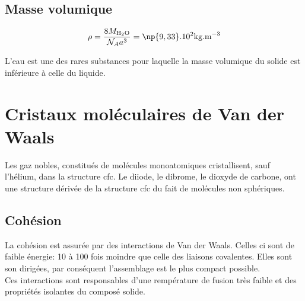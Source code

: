\subsection{Masse volumique}
\begin{equation}
    \rho = \frac{8M_{\text{H}_2\text{O}}}{\mathcal{N}_A
        a^3} = \np{9,33}.10^2\text{kg.m}^{-3}
\end{equation}
\begin{rem}
    L'eau est une des rares substances pour laquelle la
    masse volumique du solide est inférieure à celle du
    liquide.
\end{rem}

\section{Cristaux moléculaires de Van der Waals}
Les gaz nobles, constitués de molécules monoatomiques
cristallisent, sauf l’hélium, dans la structure cfc.
Le diiode, le dibrome, le dioxyde de carbone, ont
une structure dérivée de la structure cfc du
fait de molécules non sphériques.
\subsection{Cohésion}
La cohésion est assurée par des interactions de
Van der Waals. Celles ci sont de faible énergie:
10 à 100 fois moindre que celle des liaisons covalentes.
Elles sont son dirigées, par conséquent l'assemblage
est le plus compact possible.\\
Ces interactions sont responsables d'une rempérature de
fusion très faible et des propriétés isolantes du composé
solide.
